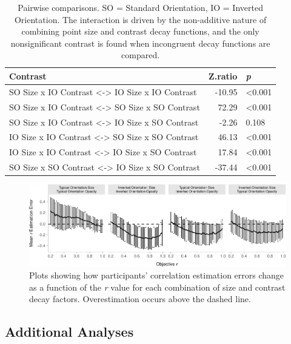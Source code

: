 \documentclass[manuscript, review, anonymous, screen]{acmart}
\begin{document}
\hypertarget{tbl-contrasts}{}
\begin{table}
\caption{\label{tbl-contrasts}Pairwise comparisons. SO = Standard Orientation, IO = Inverted
Orientation. The interaction is driven by the non-additive nature of
combining point size and contrast decay functions, and the only
nonsignificant contrast is found when incongruent decay functions are
compared. }\tabularnewline

\centering
\begin{tabular}{lrl}
\toprule
Contrast & Z.ratio & \textit{p}\\
\midrule
SO Size x IO Contrast <-> IO Size x IO Contrast & -10.95 & <0.001\\
SO Size x IO Contrast <-> SO Size x SO Contrast & 72.29 & <0.001\\
SO Size x IO Contrast <-> IO Size x SO Contrast & -2.26 & 0.108\\
IO Size x IO Contrast <-> SO Size x SO Contrast & 46.13 & <0.001\\
IO Size x IO Contrast <-> IO Size x SO Contrast & 17.84 & <0.001\\
\addlinespace
SO Size x SO Contrast <-> IO Size x SO Contrast & -37.44 & <0.001\\
\bottomrule
\end{tabular}
\end{table}

\begin{figure}

{\centering \includegraphics[width=1\textwidth,height=\textheight]{size_and_opacity_files/figure-pdf/fig-diff-error-bars-plot-1.pdf}

}

\caption{\label{fig-diff-error-bars-plot}Plots showing how participants'
correlation estimation errors change as a function of the \emph{r} value
for each combination of size and contrast decay factors. Overestimation
occurs above the dashed line.}

\end{figure}

\hypertarget{sec-add-analyses}{%
\subsection{Additional Analyses}\label{sec-add-analyses}}
\end{document}
